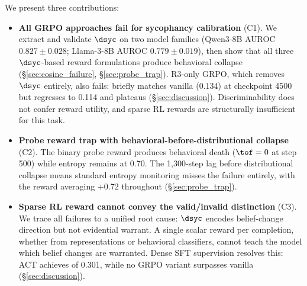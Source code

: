 We present three contributions:

\begin{itemize}
\item \textbf{All GRPO approaches fail for sycophancy calibration} (C1). We extract and validate $\dsyc$ on two model families (Qwen3-8B AUROC $0.827 \pm 0.028$; Llama-3-8B AUROC $0.779 \pm 0.019$), then show that all three $\dsyc$-based reward formulations produce behavioral collapse (\S\ref{sec:cosine_failure}, \S\ref{sec:probe_trap}). R3-only GRPO, which removes $\dsyc$ entirely, also fails: \sycon{} briefly matches vanilla (0.134) at checkpoint 4500 but regresses to 0.114 and plateaus (\S\ref{sec:discussion}). Discriminability does not confer reward utility, and sparse RL rewards are structurally insufficient for this task.

\item \textbf{Probe reward trap with behavioral-before-distributional collapse} (C2). The binary probe reward produces behavioral death ($\tof = 0$ at step 500) while entropy remains at 0.70. The 1,300-step lag before distributional collapse means standard entropy monitoring misses the failure entirely, with the reward averaging $+0.72$ throughout (\S\ref{sec:probe_trap}).

\item \textbf{Sparse RL reward cannot convey the valid/invalid distinction} (C3). We trace all failures to a unified root cause: $\dsyc$ encodes belief-change direction but not evidential warrant. A single scalar reward per completion, whether from representations or behavioral classifiers, cannot teach the model which belief changes are warranted. Dense SFT supervision resolves this: ACT achieves \sycon{} of 0.301, while no GRPO variant surpasses vanilla (\S\ref{sec:discussion}).
\end{itemize}